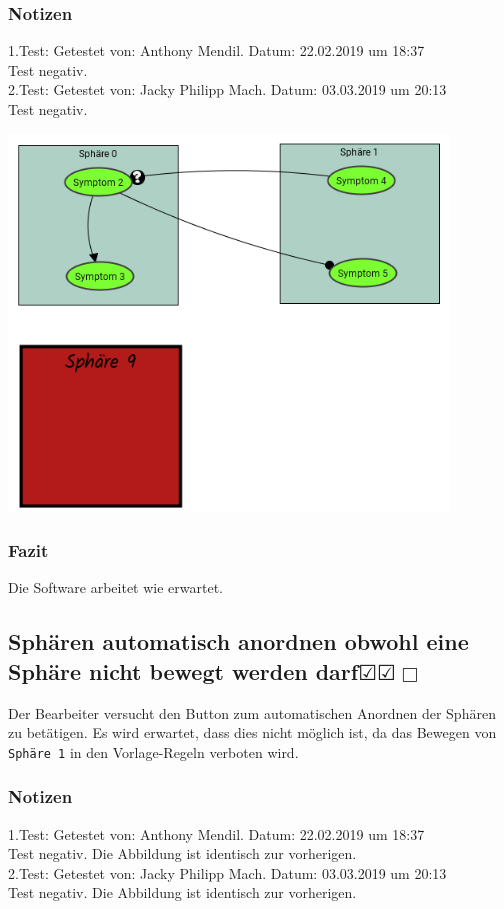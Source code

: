 \documentclass[enabledeprecatedfontcommands]{scrartcl}
\newcommand{\subsectiont}[2]{\subsection[#1]{#1{\normalsize\normalfont #2}}}
\newcommand{\leer}{$\Box$}
\newcommand{\ok}{$\CheckedBox$}
\begin{document}
\subsubsection{Notizen}
1.Test: Getestet von: Anthony Mendil. Datum: 22.02.2019 um 18:37 \\
Test negativ.\\
2.Test: Getestet von: Jacky Philipp Mach. Datum: 03.03.2019 um 20:13 \\
Test negativ. 
\begin{center}
\includegraphics[height=10cm]{2_16.PNG}
\end{center}
\subsubsection{Fazit}
Die Software arbeitet wie erwartet.

\subsectiont{Sphären automatisch anordnen obwohl eine Sphäre nicht bewegt werden darf}{\dotfill\ok\ok\leer}
Der Bearbeiter versucht den Button zum automatischen Anordnen der Sphären zu betätigen. Es wird erwartet, dass dies nicht möglich ist, da das Bewegen von \texttt{Sphäre 1} in den Vorlage-Regeln verboten wird.
\subsubsection{Notizen}
1.Test: Getestet von: Anthony Mendil. Datum: 22.02.2019 um 18:37 \\
Test negativ. Die Abbildung ist identisch zur vorherigen. \\
2.Test: Getestet von: Jacky Philipp Mach. Datum: 03.03.2019 um 20:13 \\
Test negativ. Die Abbildung ist identisch zur vorherigen. 
\end{document}
